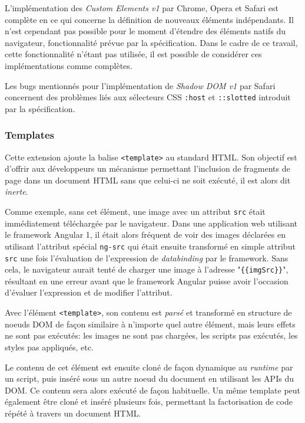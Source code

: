L'implémentation des \emph{Custom Elements v1} par Chrome, Opera et Safari est complète en ce qui concerne la définition de nouveaux éléments indépendants. Il n'est cependant pas possible pour le moment d'étendre des éléments natifs du navigateur, fonctionnalité prévue par la spécification. Dans le cadre de ce travail, cette fonctionnalité n'étant pas utilisée, il est possible de considérer ces implémentations comme complètes.

Les bugs mentionnés pour l'implémentation de \emph{Shadow DOM v1} par Safari concernent des problèmes liés aux sélecteurs CSS \texttt{:host} et \texttt{::slotted} introduit par la spécification.

\subsubsection{Templates}

Cette extension ajoute la balise \texttt{<template>} au standard HTML. Son objectif est d'offrir aux développeurs un mécanisme permettant l'inclusion de fragments de page dans un document HTML sans que celui-ci ne soit exécuté, il est alors dit \emph{inerte}.

Comme exemple, sans cet élément, une image avec un attribut \texttt{src} était immédiatement téléchargée par le navigateur. Dans une application web utilisant le framework Angular 1, il était alors fréquent de voir des images déclarées en utilisant l'attribut spécial \texttt{ng-src} qui était ensuite transformé en simple attribut \texttt{src} une fois l'évaluation de l'expression de \emph{databinding} par le framework. Sans cela, le navigateur aurait tenté de charger une image à l'adresse "\texttt{\{\{imgSrc\}\}}", résultant en une erreur avant que le framework Angular puisse avoir l'occasion d'évaluer l'expression et de modifier l'attribut.

Avec l'élément \texttt{<template>}, son contenu est \emph{parsé} et transformé en structure de noeuds DOM de façon similaire à n'importe quel autre élément, mais leurs effets ne sont pas exécutés: les images ne sont pas chargées, les scripts pas exécutés, les styles pas appliqués, etc.

Le contenu de cet élément est ensuite cloné de façon dynamique au \emph{runtime} par un script, puis inséré sous un autre noeud du document en utilisant les APIs du DOM. Ce contenu sera alors exécuté de façon habituelle. Un même template peut également être cloné et inséré plusieurs fois, permettant la factorisation de code répété à travers un document HTML.

